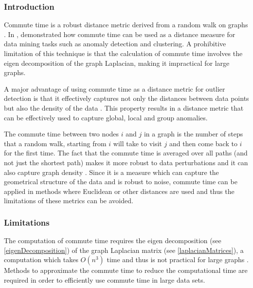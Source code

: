 \subsubsection{Introduction}
\label{commuteTime:introduction}
Commute time is a robust distance metric derived from a random walk on graphs
\cite{Khoa:2012}. In , \citeauthor{Khoa:2012} demonstrated
how commute time can be used as a distance measure for data mining tasks such as
anomaly detection and clustering. A prohibitive limitation of this technique is
that the calculation of commute time involves the eigen decomposition of the
graph Laplacian, making it impractical for large graphs.

A major advantage of using commute time as a distance metric for outlier
detection is that it effectively captures not only the distances between data
points but also the density of the data \citeNeeded{}. This property results in
a distance metric that can be effectively used to capture global, local and
group anomalies.

The commute time between two nodes $i$ and $j$ in a graph is the number of steps
that a random walk, starting from $i$ will take to visit $j$ and then come back
to $i$ for the first time. The fact that the commute time is averaged over all
paths (and not just the shortest path) makes it more robust to data
perturbations and it can also capture graph density \cite{Khoa:2012}. Since it
is a measure which can capture the geometrical structure of the data and is
robust to noise, commute time can be applied in methods where Euclidean or other
distances are used and thus the limitations of these metrics can be avoided.

\subsubsection{Limitations}
\label{commuteTime:limitations}
The computation of commute time requires the eigen decomposition (see
\autoref{eigenDecomposition}) of the graph Laplacian matrix (see
\autoref{laplacianMatrices}), a computation which takes $O(n^3)$ time and thus
is not practical for large graphs \citeNeeded{}. Methods to approximate the
commute time to reduce the computational time are required in order to
efficiently use commute time in large data sets.
